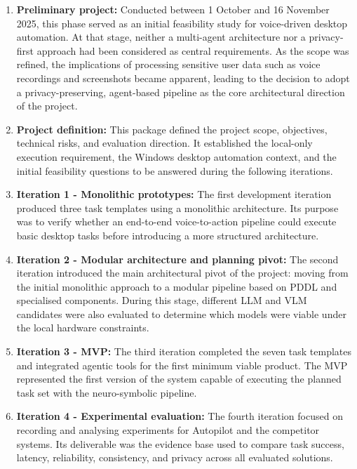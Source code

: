 \begin{enumerate}
  \item \textbf{Preliminary project:} Conducted between 1 October and 16 November 2025, this phase served as an initial feasibility study for voice-driven desktop automation. At that stage, neither a multi-agent architecture nor a privacy-first approach had been considered as central requirements. As the scope was refined, the implications of processing sensitive user data such as voice recordings and screenshots became apparent, leading to the decision to adopt a privacy-preserving, agent-based pipeline as the core architectural direction of the project.

  \item \textbf{Project definition:} This package defined the project scope, objectives, technical risks, and evaluation direction. It established the local-only execution requirement, the Windows desktop automation context, and the initial feasibility questions to be answered during the following iterations.

  \item \textbf{Iteration 1 - Monolithic prototypes:} The first development iteration produced three task templates using a monolithic architecture. Its purpose was to verify whether an end-to-end voice-to-action pipeline could execute basic desktop tasks before introducing a more structured architecture.

  \item \textbf{Iteration 2 - Modular architecture and planning pivot:} The second iteration introduced the main architectural pivot of the project: moving from the initial monolithic approach to a modular pipeline based on PDDL and specialised components. During this stage, different LLM and VLM candidates were also evaluated to determine which models were viable under the local hardware constraints.

  \item \textbf{Iteration 3 - MVP:} The third iteration completed the seven task templates and integrated agentic tools for the first minimum viable product. The MVP represented the first version of the system capable of executing the planned task set with the neuro-symbolic pipeline.

  \item \textbf{Iteration 4 - Experimental evaluation:} The fourth iteration focused on recording and analysing experiments for Autopilot and the competitor systems. Its deliverable was the evidence base used to compare task success, latency, reliability, consistency, and privacy across all evaluated solutions.


\end{enumerate}

